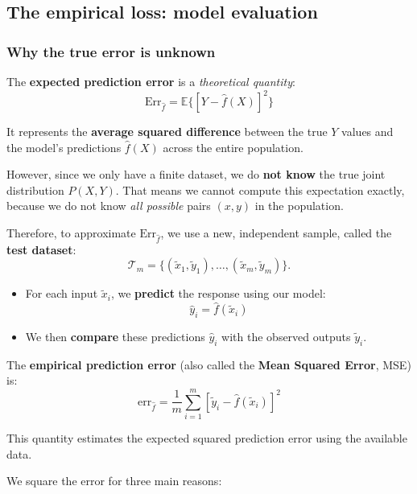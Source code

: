 \documentclass[
  letterpaper,
  DIV=11,
  numbers=noendperiod]{scrartcl}
\providecommand{\tightlist}{%
  \setlength{\itemsep}{0pt}\setlength{\parskip}{0pt}}\usepackage{longtable,booktabs,array}
\begin{document}
\subsection{The empirical loss: model
evaluation}\label{the-empirical-loss-model-evaluation}

\subsubsection{Why the true error is
unknown}\label{why-the-true-error-is-unknown}

The \textbf{expected prediction error} is a \emph{theoretical quantity}:
\[\text{Err}_{\hat{f}} = \mathbb{E}\{[Y - \hat{f}(X)]^2\}\]

It represents the \textbf{average squared difference} between the true
\(Y\) values and the model's predictions \(\hat{f}(X)\) across the
entire population.

However, since we only have a finite dataset, we do \textbf{not know}
the true joint distribution \(P(X, Y)\). That means we cannot compute
this expectation exactly, because we do not know \emph{all possible}
pairs \((x, y)\) in the population.

Therefore, to approximate \(\text{Err}_{\hat{f}}\), we use a new,
independent sample, called the \textbf{test dataset}:
\[\mathcal{T}_m = \{(\tilde{x}_1, \tilde{y}_1), \ldots, (\tilde{x}_m, \tilde{y}_m)\}.\]

\begin{itemize}
\tightlist
\item
  For each input \(\tilde{x}_i\), we \textbf{predict} the response using
  our model:\[ \hat{y}_i = \hat{f}(\tilde{x}_i) \]
\item
  We then \textbf{compare} these predictions \(\hat{y}_i\) with the
  observed outputs \(\tilde{y}_i\).
\end{itemize}

The \textbf{empirical prediction error} (also called the \textbf{Mean
Squared Error}, MSE) is:
\[\text{err}_{\hat{f}} = \frac{1}{m} \sum_{i=1}^{m} [\tilde{y}_i - \hat{f}(\tilde{x}_i)]^2\]

This quantity estimates the expected squared prediction error using the
available data.

We square the error for three main reasons:
\end{document}
